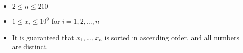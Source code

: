 \begin{itemize}
\tightlist
\item $2 \leq n \leq 200$
\item $1 \leq x_i \leq 10^9$ for $i = 1, 2, \ldots, n$
\item It is guaranteed that $x_1,\ldots,x_n$ is sorted in ascending order, and all numbers are distinct.
\end{itemize}
